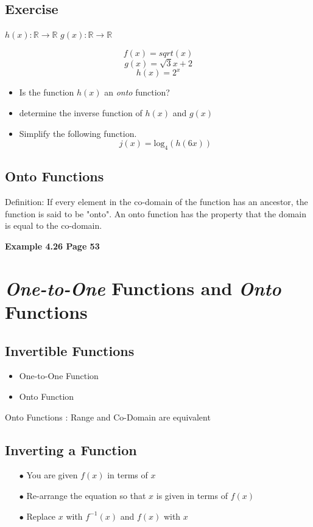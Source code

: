 \documentclass[]{report}
\begin{document}
\subsection{Exercise} 
$h(x): \mathbb{R} \rightarrow \mathbb{R}$ 
$g(x): \mathbb{R} \rightarrow \mathbb{R}$

\[f(x) = sqrt(x)\]
\[g(x) = \sqrt{3}{x+2}\]
\[h(x) = 2^x\]

\begin{itemize}
\item Is the function $h(x)$ an \textit{onto} function?
\item determine the inverse function of $h(x)$ and $g(x)$
\item Simplify the following function.
\[ j(x) = \mbox{log}_4(h(6x))\]
\end{itemize}
\subsection{Onto Functions}
Definition: If every element in the co-domain of the function has an ancestor, the function is said to be "onto".
An onto function has the property that the domain is equal to the co-domain.


\textbf{Example 4.26 Page 53}

\section{\textit{One-to-One} Functions and \textit{Onto} Functions}

\subsection{Invertible Functions}
\begin{itemize}
\item One-to-One Function
\item Onto Function
\end{itemize}

Onto Functions : Range and Co-Domain are equivalent

\subsection{Inverting a Function}

\begin{itemize}
\item[$\bullet$] You are given $f(x)$ in terms of $x$
\item[$\bullet$] Re-arrange the equation so that $x$ is given in terms of $f(x)$
\item[$\bullet$] Replace $x$ with $f^{-1}(x)$ and $f(x)$ with $x$
\end{itemize}
\end{document}
